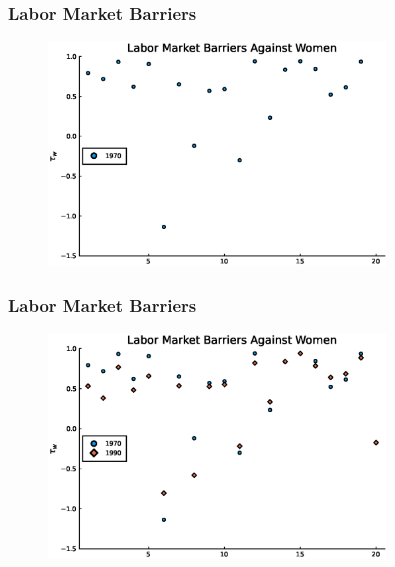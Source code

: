 \documentclass[11pt]{beamer}
\begin{document}
\begin{frame}
\frametitle{Labor Market Barriers}
\label{barriers}
\begin{figure}
\begin{center}
\includegraphics[width=0.8\textwidth]{tau_w_women_70.eps}
\label{ }
\end{center}
\end{figure}
\hyperlink{occupations}{}
\end{frame}

\begin{frame}
\frametitle{Labor Market Barriers}
\begin{figure}
\begin{center}
\includegraphics[width=0.8\textwidth]{tau_w_women_70_90.eps}
\label{ }
\end{center}
\end{figure}
\hyperlink{occupations}{}
\end{frame}
\end{document}
